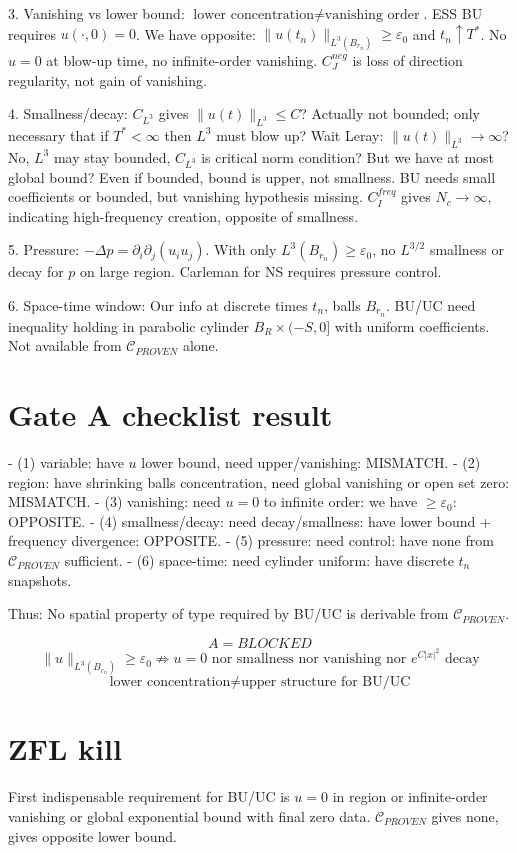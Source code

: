 \documentclass[11pt]{article}
\begin{document}
3. Vanishing vs lower bound: $\boxed{\text{lower concentration}\neq\text{vanishing order}}$. ESS BU requires $u(\cdot,0)=0$. We have opposite: $\|u(t_n)\|_{L^3(B_{r_n})}\ge\varepsilon_0$ and $t_n\uparrow T^*$. No $u=0$ at blow-up time, no infinite-order vanishing. $C_J^{neg}$ is loss of direction regularity, not gain of vanishing.

4. Smallness/decay: $C_{L^3}$ gives $\|u(t)\|_{L^3}\le C$? Actually not bounded; only necessary that if $T^*<\infty$ then $L^3$ must blow up? Wait Leray: $\|u(t)\|_{L^3}\to\infty$? No, $L^3$ may stay bounded, $C_{L^3}$ is critical norm condition? But we have at most global bound? Even if bounded, bound is upper, not smallness. BU needs small coefficients or bounded, but vanishing hypothesis missing. $C_I^{freq}$ gives $N_c\to\infty$, indicating high-frequency creation, opposite of smallness.

5. Pressure: $-\Delta p =\partial_i\partial_j(u_iu_j)$. With only $L^3(B_{r_n})\ge\varepsilon_0$, no $L^{3/2}$ smallness or decay for $p$ on large region. Carleman for NS requires pressure control.

6. Space-time window: Our info at discrete times $t_n$, balls $B_{r_n}$. BU/UC need inequality holding in parabolic cylinder $B_R\times(-S,0]$ with uniform coefficients. Not available from $\mathcal C_{PROVEN}$ alone.

\section{Gate A checklist result}
- (1) variable: have $u$ lower bound, need upper/vanishing: MISMATCH.
- (2) region: have shrinking balls concentration, need global vanishing or open set zero: MISMATCH.
- (3) vanishing: need $u=0$ to infinite order: we have $\ge\varepsilon_0$: OPPOSITE.
- (4) smallness/decay: need decay/smallness: have lower bound + frequency divergence: OPPOSITE.
- (5) pressure: need control: have none from $\mathcal C_{PROVEN}$ sufficient.
- (6) space-time: need cylinder uniform: have discrete $t_n$ snapshots.

Thus: No spatial property of type required by BU/UC is derivable from $\mathcal C_{PROVEN}$.

\[
\boxed{A = BLOCKED}
\]
\[
\boxed{\|u\|_{L^3(B_{r_n})}\ge\varepsilon_0 \not\Rightarrow u=0\text{ nor smallness nor vanishing nor }e^{C|x|^2}\text{ decay}}
\]
\[
\boxed{\text{lower concentration}\neq\text{upper structure for BU/UC}}
\]

\section{ZFL kill}
First indispensable requirement for BU/UC is $u=0$ in region or infinite-order vanishing or global exponential bound with final zero data. $\mathcal C_{PROVEN}$ gives none, gives opposite lower bound.
\end{document}
